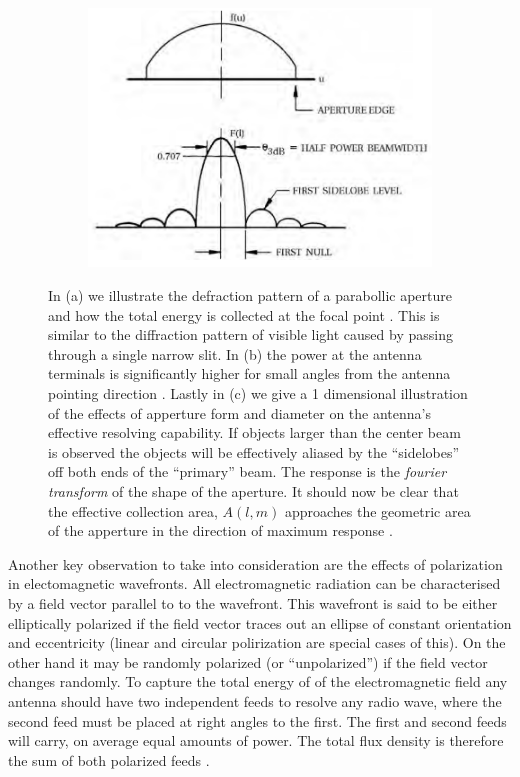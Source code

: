 \documentclass[a4paper,10pt]{report}
\begin{document}
\begin{figure}[ht]
\begin{mdframed}
  \begin{subfigure}[b]{0.3\textwidth}
   \includegraphics[width=\textwidth]{images/radiation_pattern.png}
   \caption{}
  \end{subfigure}
  \caption[Collection of electromagnetic wave energy and responce]{In (a) we illustrate the defraction pattern of a parabollic aperture and how the total energy is collected at the focal point \cite{christiansenradiotelescopes}. This is similar to the diffraction pattern of
  visible light caused by passing through a single narrow slit. In (b) the power at the antenna terminals is significantly higher for small angles from the antenna pointing direction \cite{christiansenradiotelescopes}. Lastly in (c) we give a 1 dimensional illustration of 
  the effects of apperture form and diameter on the antenna's effective resolving capability. If objects larger than the center beam is observed the objects will be effectively aliased by the ``sidelobes'' off both ends of the ``primary'' beam. The response is the \textit{fourier transform} 
  of the shape of the aperture. It should now be clear that the effective collection area, $A(l,m)$ approaches the geometric area of the apperture in the direction of maximum response \cite{taylor1999synthesis}.}
  \label{diffraction_pattern_and_power_at_focus}
 \end{mdframed}
\end{figure}

Another key observation to take into consideration are the effects of polarization in electomagnetic wavefronts. All electromagnetic radiation can be characterised by a field vector parallel to to the wavefront. This wavefront is said to
be either elliptically polarized if the field vector traces out an ellipse of constant orientation and eccentricity (linear and circular polirization are special cases of this). On the other hand it may be randomly polarized (or ``unpolarized'') if the field 
vector changes randomly. To capture the total energy of of the electromagnetic field any antenna should have two independent feeds to resolve any radio wave, where the second feed must be placed at right angles to the first. The first and second feeds will carry, 
on average equal amounts of power. The total flux density is therefore the sum of both polarized feeds \cite{christiansenradiotelescopes}.
\end{document}
